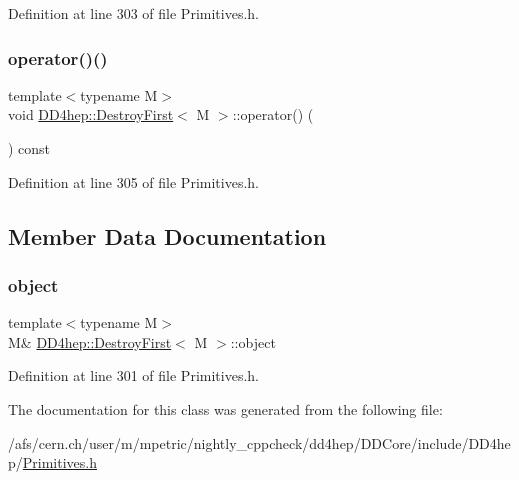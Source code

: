 Definition at line 303 of file Primitives.\+h.

\hypertarget{class_d_d4hep_1_1_destroy_first_af5aaa086b4ebf2d3c7d50cfc7ab6bde4}{}\label{class_d_d4hep_1_1_destroy_first_af5aaa086b4ebf2d3c7d50cfc7ab6bde4} 
\subsubsection{\texorpdfstring{operator()()}{operator()()}\hspace{0.1cm}{\footnotesize\ttfamily [2/2]}}
{\footnotesize\ttfamily template$<$typename M$>$ \\
void \hyperlink{class_d_d4hep_1_1_destroy_first}{D\+D4hep\+::\+Destroy\+First}$<$ M $>$\+::operator() (\begin{DoxyParamCaption}{ }\end{DoxyParamCaption}) const\hspace{0.3cm}{\ttfamily [inline]}}



Definition at line 305 of file Primitives.\+h.



\subsection{Member Data Documentation}
\hypertarget{class_d_d4hep_1_1_destroy_first_a18b46ba57a4b4115bbfd3774f8632ea1}{}\label{class_d_d4hep_1_1_destroy_first_a18b46ba57a4b4115bbfd3774f8632ea1} 
\subsubsection{\texorpdfstring{object}{object}}
{\footnotesize\ttfamily template$<$typename M$>$ \\
M\& \hyperlink{class_d_d4hep_1_1_destroy_first}{D\+D4hep\+::\+Destroy\+First}$<$ M $>$\+::object}



Definition at line 301 of file Primitives.\+h.



The documentation for this class was generated from the following file\+:\begin{DoxyCompactItemize}
\item 
/afs/cern.\+ch/user/m/mpetric/nightly\+\_\+cppcheck/dd4hep/\+D\+D\+Core/include/\+D\+D4hep/\hyperlink{_primitives_8h}{Primitives.\+h}\end{DoxyCompactItemize}
